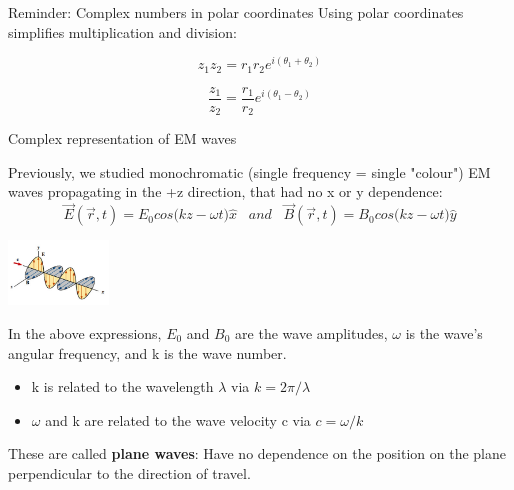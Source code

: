 {\begin{frame}{Reminder: Complex numbers in polar coordinates}
\vspace{0.3cm}
Using polar coordinates simplifies multiplication
and division:

\begin{equation*}
  z_1 z_2 = r_1 r_2 e^{i (\theta_1 + \theta_2)}
\end{equation*}

\begin{equation*}
  \frac{z_1}{z_2} = \frac{r_1}{r_2} e^{i (\theta_1 - \theta_2)}
\end{equation*}

\end{frame}


} %


%
%
%

\begin{frame}{Complex representation of EM waves}

Previously, we studied monochromatic
(single frequency = single "colour") EM waves propagating in the +z
direction, that had no x or y dependence:
\begin{equation*}
    \vec{E}(\vec{r},t) = E_0 cos\Big(kz-\omega t \Big) \hat{x} \;\;\; and \;\;\;
    \vec{B}(\vec{r},t) = B_0 cos\Big(kz-\omega t \Big) \hat{y}
\end{equation*}

\begin{center}
  \includegraphics[width=0.20\textwidth]{./images/schematics/emwave_01.jpg}\\
\end{center}

In the above expressions, $E_0$ and $B_0$ are the wave amplitudes,
$\omega$ is the wave's angular frequency, and k is the wave number.\\
\begin{itemize}
  \item k is related to the wavelength $\lambda$ via $k = 2\pi/\lambda$\\
  \item $\omega$ and k are related to the wave velocity c via $c = \omega/k$
\end{itemize}

\vspace{0.3cm}
These are called {\bf plane waves}:
Have no dependence on the position on the plane perpendicular to the direction of travel.

\end{frame}


